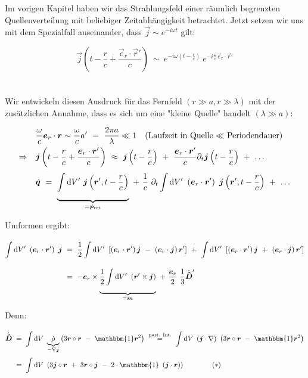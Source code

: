 Im vorigen Kapitel haben wir das Strahlungsfeld einer räumlich begrenzten Quellenverteilung mit beliebiger Zeitabhängigkeit betrachtet. Jetzt setzen wir uns mit dem Spezialfall auseinander, dass $\vec{j}\sim e^{-i\omega t}$ gilt:

\begin{equation*}
\vec{j}\left(t-\frac{r}{c} + \frac{\vec{e}_r \cdot\vec{r}'}{c}\right) \ \sim \ e^{-i\omega\left(t-\frac{r}{c}\right)} \ e^{-i\frac{\omega}{c} \vec{e}_r\cdot\vec{r}'}
\end{equation*}\\
\ \\

Wir entwickeln diesen Ausdruck für das Fernfeld $(r\gg a, r \gg \lambda)$ mit der zusätzlichen Annahme, dass es sich um eine "kleine Quelle" handelt $(\lambda\gg a)$:

\begin{align*}
&\frac{\omega}{c} \vec{e}_r \cdot \vec{r} \sim \frac{\omega}{c}a' \ = \  \frac{2\pi a}{\lambda} \ll 1 \quad\text{(Laufzeit in Quelle $\ll$ Periodendauer)}\\
\Rightarrow\quad &\vec{j}\left(t-\frac{r}{c}+\frac{\vec{e}_r\cdot\vec{r}'}{c}\right) \ \approx \ \vec{j}\left(t-\frac{r}{c}\right) \ + \ \frac{\vec{e}_r\cdot\vec{r}'}{c}\partial_t\vec{j}\left(t-\frac{r}{c}\right) \ + \ \ldots\\
&\dot{\vec{q}}  \ = \ \underbrace{\Int{}{}{V'}\vec{j}\left(\vec{r}',t-\frac{r}{c}\right)}_{=\dot{\vec{p}}_{\text{ret}}} \ + \ \frac{1}{c} \ \partial_t \Int{}{}{V'}\left(\vec{e}_r\cdot\vec{r}'\right) \ \vec{j} \left(\vec{r}', t- \frac{r}{c}\right) \ + \ \ldots
\end{align*}

Umformen ergibt:

\begin{align*}
\Int{}{}{V'} \left(\vec{e}_r\cdot\vec{r}'\right) \ \vec{j}  \ &= \ \frac{1}{2}\Int{}{}{V'} \left[\left(\vec{e}_r\cdot\vec{r}'\right)\vec{j} \ - \ \left(\vec{e}_r \cdot \vec{j}\right)\vec{r}'\right] \ + \ \Int{}{}{V'} \left[\left(\vec{e}_r\cdot\vec{r}'\right)\vec{j} \ + \ \left(\vec{e}_r\cdot\vec{j}\right)\vec{r}'\right]\\
&= \ -\vec{e}_r \times\underbrace{\frac{1}{2}\Int{}{}{V'}\left(\vec{r}'\times\vec{j}\right)}_{=\vec{m}} \ + \ \frac{\vec{e}_r}{2} \ \frac{1}{3} \dot{\tens{D}}'
\end{align*}

Denn:

\begin{align*}
\dot{\tens{D}} \ &= \ \Int{}{}{V}\underbrace{\dot{\rho}}_{-\nabla\vec{j}} \left(3\vec{r}\circ\vec{r} \ - \ \mathbbm{1} \vec{r}^2\right)  \ \overset{\text{part. Int.}}{=} \ \Int{}{}{V} \left(\vec{j}\cdot\nabla\right) \ \left(3\vec{r}\circ\vec{r} \ - \ \mathbbm{1}\vec{r}^2\right)\\
&= \ \Int{}{}{V}\left(3\vec{j}\circ\vec{r} \ + \ 3\vec{r}\circ\vec{j} \ - \ 2 \cdot \mathbbm{1} \ \left(\vec{j}\cdot\vec{r}\right)\right) \qquad\qquad(*)
\end{align*}

